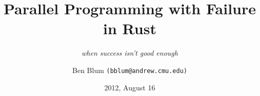 \documentclass[xcolor=dvipsnames]{beamer}
\title[Linked Task Failure]{{\bf Parallel Programming with Failure in Rust}}
\subtitle[]{ {\em when success isn't good enough}}
\author[Ben Blum]{Ben Blum \texttt{(bblum@andrew.cmu.edu)}}
\institute[Mozilla Research]{Mozilla Research}
\date[]{2012, August 16}
\begin{document}
\renewcommand{\inserttotalframenumber}{28}
\normalem
\begin{frame}
	\titlepage
\end{frame}


\newcommand\linegap{\vspace{0.2in}}
\newcommand\breakslide[1]{\begin{frame}{} \begin{center} \Large #1 \end{center} \end{frame}}
\newcommand\related[1]{\textsuperscript{\em [#1]}}
\newcommand\hilight[2]{\color{#1}#2\color{black}}
\end{document}
